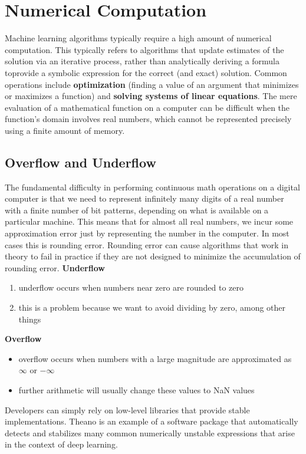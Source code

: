 \documentclass[11pt, twocolumn]{report}
\begin{document}
\setcounter{chapter}{3}

\chapter{Numerical Computation}
Machine learning algorithms typically require a high amount of numerical
computation. This typically refers to algorithms that update estimates of the
solution via an iterative process, rather than analytically deriving a formula
toprovide a symbolic expression for the correct (and exact) solution. Common
operations include \textbf{optimization} (finding a value of an argument that
minimizes or maximizes a function) and \textbf{solving systems of linear
  equations}. The mere evaluation of a mathematical function on a computer can
be difficult when the function's domain involves real numbers, which cannot be
represented precisely using a finite amount of memory.

\section{Overflow and Underflow}
The fundamental difficulty in performing continuous math operations on a
digital computer is that we need to represent infinitely many digits of a real
number with a finite number of bit patterns, depending on what is available on
a particular machine. This means that for almost all real numbers, we incur
some approximation error just by representing the number in the computer. In
most cases this is rounding error.  Rounding error can cause algorithms that
work in theory to fail in practice if they are not designed to minimize the
accumulation of rounding error.
\textbf{Underflow}
\begin{enumerate}
  \item underflow occurs when numbers near zero are rounded to zero
  \item this is a problem because we want to avoid dividing by zero, among
    other things
\end{enumerate}

\textbf{Overflow}
\begin{itemize}
  \item overflow occurs when numbers with a large magnitude are approximated as
    $\infty$ or $-\infty$
  \item further arithmetic will usually change these values to NaN values
\end{itemize}

Developers can simply rely on low-level libraries that provide stable
implementations.  Theano is an example of a software package that automatically
detects and stabilizes many common numerically unstable expressions that arise
in the context of deep learning.
\end{document}
